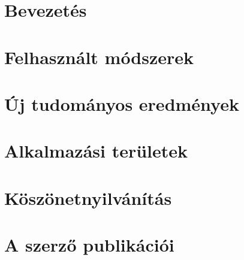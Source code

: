 \documentclass[twoside]{article}
\begin{document}



\section{Bevezetés}
% 
% 
\section{Felhasznált módszerek}


\section{Új tudományos eredmények}


\section{Alkalmazási területek}


\section{Köszönetnyilvánítás}
%

\section{A szerző publikációi}

\end{document}
